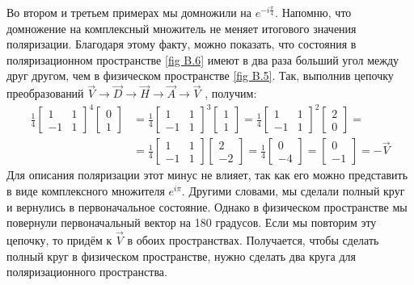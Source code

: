 Во втором и третьем примерах мы домножили на $e^{-i\frac{\pi}{4}}$. Напомню, что домножение на комплексный множитель не меняет итогового значения поляризации. Благодаря этому факту, можно показать, что состояния в поляризационном пространстве \ref{fig B.6} имеют в два раза больший угол между друг другом, чем в физическом пространстве \ref{fig B.5}. Так, выполнив цепочку преобразований $\vec{V} \rightarrow \vec{D} \rightarrow \vec{H} \rightarrow \vec{A} \rightarrow \vec{V}$ , получим:
\begin{align*}
\frac{1}{4}\begin{bmatrix} 1 & 1 \\ -1 & 1 \end{bmatrix}^4\begin{bmatrix} 0 \\ 1 \end{bmatrix} &= \frac{1}{4}\begin{bmatrix} 1 & 1 \\ -1 & 1 \end{bmatrix}^3\begin{bmatrix} 1 \\ 1 \end{bmatrix} = \frac{1}{4}\begin{bmatrix} 1 & 1 \\ -1 & 1 \end{bmatrix}^2\begin{bmatrix} 2 \\ 0 \end{bmatrix} = \\
&=\frac{1}{4}\begin{bmatrix} 1 & 1 \\ -1 & 1 \end{bmatrix}\begin{bmatrix} 2 \\ -2 \end{bmatrix} = \frac{1}{4}\begin{bmatrix} 0 \\ -4 \end{bmatrix} = \begin{bmatrix} 0 \\ -1 \end{bmatrix} = -\vec{V}
\end{align*}
Для описания поляризации этот минус не влияет, так как его можно представить в виде комплексного множителя $e^{i\pi}$. Другими словами, мы сделали полный круг и вернулись в первоначальное состояние. Однако в физическом пространстве мы повернули первоначальный вектор на 180 градусов. Если мы повторим эту цепочку, то придём к $\vec{V}$ в обоих пространствах. Получается, чтобы сделать полный круг в физическом пространстве, нужно сделать два круга для поляризационного пространства. 

